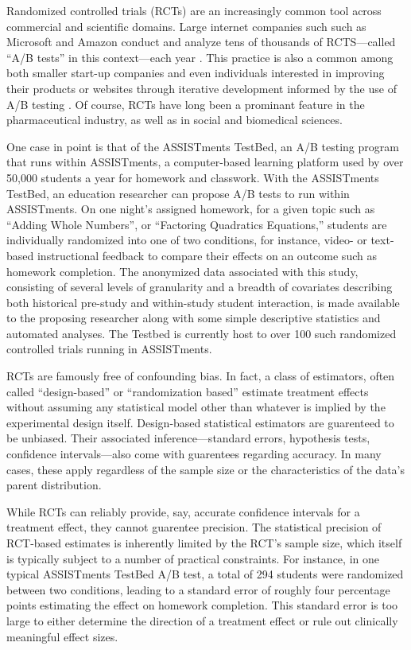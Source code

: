 Randomized controlled trials (RCTs) are an increasingly common tool
across commercial and scientific domains.
Large internet companies such such as Microsoft and Amazon conduct and
analyze tens of thousands of RCTS---called
``A/B tests'' in this context---each year \citep{kohavi2017surprising}. This practice is also a
common among both  smaller start-up companies and even individuals
interested in improving their products or websites through iterative
development informed by the use of A/B testing \citep{ries2011lean}.
Of course, RCTs have long been a prominant feature in the
pharmaceutical industry, as well as in social and biomedical
sciences.

One case in point is that of  the ASSISTments TestBed, an A/B testing
program that runs within ASSISTments, a computer-based learning
platform used by over 50,000 students a year for homework and
classwork.
With the ASSISTments TestBed, an education
researcher can propose A/B tests to run within ASSISTments.
On one night's assigned homework, for a given topic such as ``Adding
Whole Numbers'', or
``Factoring Quadratics Equations,'' students are individually randomized
into one of two conditions, for instance, video- or text-based
instructional feedback to compare their effects on an outcome such as
homework completion. The anonymized data associated with this study,
consisting of several levels of granularity and a breadth of
covariates describing both historical pre-study and within-study
student interaction, is made available to the proposing researcher
along with some simple descriptive statistics and automated
analyses. The Testbed is currently host to over 100 such randomized
controlled trials running in ASSISTments.

RCTs are famously free of confounding bias.
In fact, a class of estimators, often called ``design-based''
\citet[e.g.][]{schochet2015statistical} or ``randomization based''
\citet[e.g.][]{rosenbaum:2002a} estimate treatment effects without assuming
any statistical model other than whatever is implied by the
experimental design itself.
Design-based statistical estimators are guarenteed to be unbiased.
Their associated inference---standard errors, hypothesis tests,
confidence intervals---also come with guarentees regarding accuracy.
In many cases, these apply regardless of the sample size or
the characteristics of the data's parent distribution.

While RCTs can reliably provide, say, accurate confidence intervals
for a treatment effect, they cannot guarentee precision.
The statistical precision of RCT-based estimates is inherently limited
by the RCT's sample size, which itself is typically subject to a
number of practical constraints.
For instance, in one typical ASSISTments TestBed A/B test, a total of
294 students were randomized between two conditions, leading to a
standard error of roughly four percentage points estimating the effect
on homework completion.
This standard error is too large to either determine the direction of
a treatment effect or rule out clinically meaningful effect sizes.

